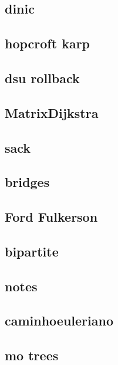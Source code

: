 \subsection{dinic}
\raggedbottom
\hrulefill
\subsection{hopcroft karp}
\raggedbottom
\hrulefill
\subsection{dsu rollback}
\raggedbottom
\hrulefill
\subsection{MatrixDijkstra}
\raggedbottom
\hrulefill
\subsection{sack}
\raggedbottom
\hrulefill
\subsection{bridges}
\raggedbottom
\hrulefill
\subsection{Ford Fulkerson}
\raggedbottom
\hrulefill
\subsection{bipartite}
\raggedbottom
\hrulefill
\subsection{notes}
\raggedbottom
\hrulefill
\subsection{caminhoeuleriano}
\raggedbottom
\hrulefill
\subsection{mo trees}
\raggedbottom
\hrulefill
